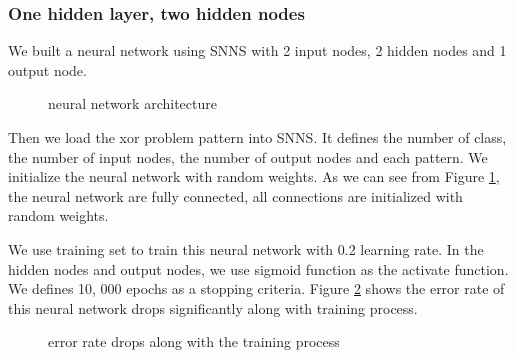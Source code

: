 \documentclass[11pt, a4paper, oneside, openright]{article}
\begin{document}
\subsubsection{One hidden layer, two hidden nodes}
We built a neural network using SNNS \cite{Petron99} with 2 input nodes, 2 hidden nodes and 1 output node.
  \begin{figure}[!ht]
  \centerline{}
  \caption{neural network architecture}
  \label{fig:neural}
  \end{figure}

Then we load the xor problem pattern into SNNS. It  defines the number of class, the number of input nodes, the number of output nodes and each pattern. We initialize the neural network with random weights.  As we can see from Figure \ref{fig:neural}, the neural network are fully connected,  all connections are initialized with random weights.

We use training set to train this neural network with 0.2 learning rate. In the hidden nodes and output nodes, we use sigmoid function as the activate function. We defines 10, 000 epochs as a stopping criteria. Figure 
\ref{fig:errorate} shows the  error rate of  this neural network drops significantly along with training process.
  \begin{figure}[!ht]
  \centerline{}
  \caption{error rate drops along with the training process}
  \label{fig:errorate}
  \end{figure}
\end{document}
